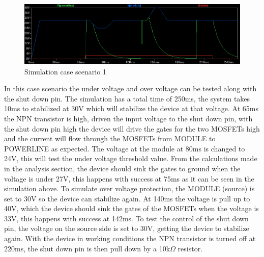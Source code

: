 \begin{figure}[H]
	\begin{centering}
		\includegraphics[width=1\textwidth]{images/tb5_LTC_case1.png}
		\caption{Simulation case scenario 1}
	\end{centering}
\end{figure}
In this case scenario the under voltage and over voltage can be tested along with the shut down pin. The simulation has a total time of 250ms, the system takes 10ms to stabilized at 30V which will stabilize the device at that voltage. At 65ms the NPN transistor is high, driven the input voltage to the shut down pin, with the shut down pin high the device will drive the gates for the two MOSFETs high and the current will flow through the MOSFETs from MODULE to POWERLINE as expected. 
The voltage at the module at 80ms is changed to 24V, this will test the under voltage threshold value. From the calculations made in the analysis section, the device should sink the gates to ground when the voltage is under 27V, this happens with success at 75ms as it can be seen in the simulation above.
To simulate over voltage protection, the MODULE (source) is set to 30V so the device can stabilize again. At 140ms the voltage is pull up to 40V, which the device should sink the gates of the MOSFETs when the voltage is 33V, this happens with success at 142ms.
To test the control of the shut down pin, the voltage on the source side is set to 30V, getting the device to stabilize again. With the device in working conditions the NPN transistor is turned off at 220ms, the shut down pin is then pull down by a 10k$ \Omega $ resistor.\\


